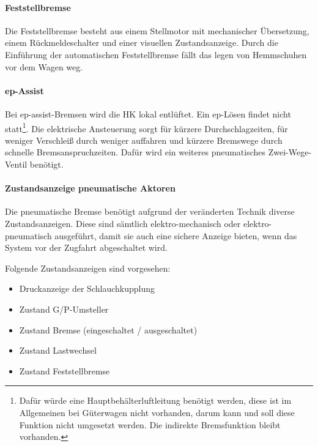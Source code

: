 \paragraph{Feststellbremse} Die Feststellbremse besteht aus einem Stellmotor mit mechanischer Übersetzung, einem Rückmeldeschalter und einer visuellen Zustandsanzeige. Durch die Einführung der automatischen Feststellbremse fällt das legen von Hemmschuhen vor dem Wagen weg.

\paragraph{ep-Assist} Bei  \gls{ep-assist-Bremsen} wird die HK lokal entlüftet. Ein ep-Lösen findet nicht statt\footnote{Dafür würde eine Hauptbehälterluftleitung benötigt werden, diese ist im Allgemeinen bei Güterwagen nicht vorhanden, darum kann und soll diese Funktion nicht umgesetzt werden. Die indirekte Bremsfunktion bleibt vorhanden.}.  Die elektrische Ansteuerung sorgt für kürzere Durchschlagzeiten, für weniger Verschleiß durch weniger auffahren und kürzere Bremswege durch schnelle Bremsanspruchzeiten. Dafür wird ein weiteres pneumatisches Zwei-Wege-Ventil benötigt.

\paragraph{Zustandsanzeige pneumatische Aktoren}\label{sec:ZustandKupplung}
Die pneumatische Bremse benötigt aufgrund der veränderten Technik diverse Zustandsanzeigen. Diese sind sämtlich elektro-mechanisch oder elektro-pneumatisch ausgeführt, damit sie auch eine sichere Anzeige bieten, wenn das System vor der Zugfahrt abgeschaltet wird.\par
Folgende Zustandsanzeigen sind vorgesehen:
\begin{itemize}
    \item Druckanzeige der Schlauchkupplung
    \item Zustand G/P-Umsteller
    \item Zustand Bremse (eingeschaltet / ausgeschaltet)
    \item Zustand Lastwechsel
    \item Zustand Feststellbremse
\end{itemize}
